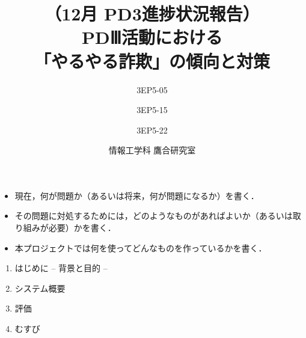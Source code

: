 

% 
%
\MyLogo{}

% 
%

\cfoot{\thepage/\pageref{LastPage}}

% 
%

\title{
{\large （12月 PD3進捗状況報告）}\\\vspace{10mm}
{\LARGE PDⅢ活動における\\「やるやる詐欺」の傾向と対策}
}
\date{情報工学科 鷹合研究室}
\author{
3EP5-05\\  \and
3EP5-15\\  \and 
3EP5-22\\ 
}




\maketitle %

\begin{itemize} 
 \item 現在，何が問題か（あるいは将来，何が問題になるか）を書く．
 \item その問題に対処するためには，どのようなものがあればよいか（あるいは取り組みが必要）かを書く．
 \item 本プロジェクトでは何を使ってどんなものを作っているかを書く．
\end{itemize}
\newpage

\begin{enumerate}
	\item {\color{gray}はじめに -- 背景と目的 --}
	\item システム概要
	\item 評価
	\item むすび
\end{enumerate}
\newpage

